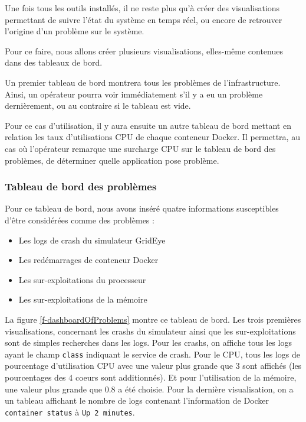 \documentclass[paper=a4, fontsize=11pt]{scrartcl}
\begin{document}
Une fois tous les outils installés, il ne reste plus qu'à créer des visualisations permettant de suivre l'état du système en temps réel, ou encore de retrouver l'origine d'un problème sur le système.

Pour ce faire, nous allons créer plusieurs visualisations, elles-même contenues dans des tableaux de bord.

Un premier tableau de bord montrera tous les problèmes de l'infrastructure. Ainsi, un opérateur pourra voir immédiatement s'il y a eu un problème dernièrement, ou au contraire si le tableau est vide.

Pour ce cas d'utilisation, il y aura ensuite un autre tableau de bord mettant en relation les taux d'utilisations CPU de chaque conteneur Docker. Il permettra, au cas où l'opérateur remarque une surcharge CPU sur le tableau de bord des problèmes, de déterminer quelle application pose problème.

\subsubsection{Tableau de bord des problèmes} \label{sss-tableauDeBordDesProblemes}

Pour ce tableau de bord, nous avons inséré quatre informations susceptibles d'être considérées comme des \og problèmes \fg :
\begin{itemize}
    \item Les logs de crash du simulateur GridEye
    \item Les redémarrages de conteneur Docker
    \item Les sur-exploitations du processeur
    \item Les sur-exploitations de la mémoire
\end{itemize}

La figure \ref{f-dashboardOfProblems} montre ce tableau de bord. Les trois premières visualisations, concernant les crashs du simulateur ainsi que les sur-exploitations sont de simples recherches dans les logs. Pour les crashs, on affiche tous les logs ayant le champ \verb,class, indiquant le service de crash. Pour le CPU, tous les logs de pourcentage d'utilisation CPU avec une valeur plus grande que 3 sont affichés (les pourcentages des 4 coeurs sont additionnés). Et pour l'utilisation de la mémoire, une valeur plus grande que 0.8 a été choisie. Pour la dernière visualisation, on a un tableau affichant le nombre de logs contenant l'information de Docker \verb,container status, à \verb,Up 2 minutes,.
\end{document}
